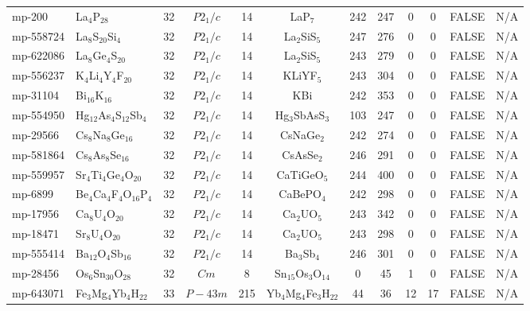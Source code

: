 {\begin{longtable}{llcccccccccc}
    mp-200 & La$_{4}$P$_{28}$ & 32    & $P2_1/c$ & 14    & LaP$_{7}$ & 242   & 247   & 0     & 0     & FALSE & N/A \\
    mp-558724 & La$_{8}$S$_{20}$Si$_{4}$ & 32    & $P2_1/c$ & 14    & La$_{2}$SiS$_{5}$ & 247   & 276   & 0     & 0     & FALSE & N/A \\
    mp-622086 & La$_{8}$Ge$_{4}$S$_{20}$ & 32    & $P2_1/c$ & 14    & La$_{2}$SiS$_{5}$ & 243   & 279   & 0     & 0     & FALSE & N/A \\
    mp-556237 & K$_{4}$Li$_{4}$Y$_{4}$F$_{20}$ & 32    & $P2_1/c$ & 14    & KLiYF$_{5}$ & 243   & 304   & 0     & 0     & FALSE & N/A \\
    mp-31104 & Bi$_{16}$K$_{16}$ & 32    & $P2_1/c$ & 14    & KBi   & 242   & 353   & 0     & 0     & FALSE & N/A \\
    mp-554950 & Hg$_{12}$As$_{4}$S$_{12}$Sb$_{4}$ & 32    & $P2_1/c$ & 14    & Hg$_{3}$SbAsS$_{3}$ & 103   & 247   & 0     & 0     & FALSE & N/A \\
    mp-29566 & Cs$_{8}$Na$_{8}$Ge$_{16}$ & 32    & $P2_1/c$ & 14    & CsNaGe$_{2}$ & 242   & 274   & 0     & 0     & FALSE & N/A \\
    mp-581864 & Cs$_{8}$As$_{8}$Se$_{16}$ & 32    & $P2_1/c$ & 14    & CsAsSe$_{2}$ & 246   & 291   & 0     & 0     & FALSE & N/A \\
    mp-559957 & Sr$_{4}$Ti$_{4}$Ge$_{4}$O$_{20}$ & 32    & $P2_1/c$ & 14    & CaTiGeO$_{5}$ & 244   & 400   & 0     & 0     & FALSE & N/A \\
    mp-6899 & Be$_{4}$Ca$_{4}$F$_{4}$O$_{16}$P$_{4}$ & 32    & $P2_1/c$ & 14    & CaBePO$_{4}$ & 242   & 298   & 0     & 0     & FALSE & N/A \\
    mp-17956 & Ca$_{8}$U$_{4}$O$_{20}$ & 32    & $P2_1/c$ & 14    & Ca$_{2}$UO$_{5}$ & 243   & 342   & 0     & 0     & FALSE & N/A \\
    mp-18471 & Sr$_{8}$U$_{4}$O$_{20}$ & 32    & $P2_1/c$ & 14    & Ca$_{2}$UO$_{5}$ & 243   & 298   & 0     & 0     & FALSE & N/A \\
    mp-555414 & Ba$_{12}$O$_{4}$Sb$_{16}$ & 32    & $P2_1/c$ & 14    & Ba$_{3}$Sb$_{4}$ & 246   & 301   & 0     & 0     & FALSE & N/A \\
    mp-28456 & Os$_{6}$Sn$_{30}$O$_{28}$ & 32    & $Cm$  & 8     & Sn$_{15}$Os$_{3}$O$_{14}$ & 0     & 45    & 1     & 0     & FALSE & N/A \\
    mp-643071 & Fe$_{3}$Mg$_{4}$Yb$_{4}$H$_{22}$ & 33    & $P-43m$ & 215   & Yb$_{4}$Mg$_{4}$Fe$_{3}$H$_{22}$ & 44    & 36    & 12    & 17    & FALSE & N/A \\

\end{longtable}}
